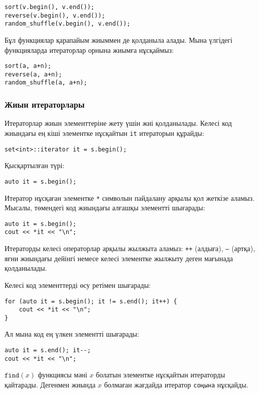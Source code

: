 
\begin{lstlisting}
sort(v.begin(), v.end());
reverse(v.begin(), v.end());
random_shuffle(v.begin(), v.end());
\end{lstlisting}

Бұл функциялар қарапайым жиыммен де қолданыла алады.
Мына үлгідегі функцияларда итераторлар орнына жиымға нұсқаймыз:

\begin{lstlisting}
sort(a, a+n);
reverse(a, a+n);
random_shuffle(a, a+n);
\end{lstlisting}

\subsubsection{Жиын итераторлары}
Итераторлар жиын элементтеріне жету үшін жиі қолданылады.
Келесі код жиындағы ең кіші элементке нұсқайтын \texttt{it} итераторын
құрайды:
\begin{lstlisting}
set<int>::iterator it = s.begin();
\end{lstlisting}
Қысқартылған түрі:
\begin{lstlisting}
auto it = s.begin();
\end{lstlisting}
Итератор нұсқаған элементке \texttt{*} символын 
пайдалану арқылы қол жеткізе аламыз.
Мысалы, төмендегі код жиындағы алғашқы элементті шығарады:

\begin{lstlisting}
auto it = s.begin();
cout << *it << "\n";
\end{lstlisting}

Итераторды келесі операторлар арқылы жылжыта аламыз:
\texttt{++} (алдыға), \texttt{--} (артқа), яғни жиындағы дейінгі немесе келесі элементке жылжыту
деген мағынада қолданылады.

Келесі код элементтерді өсу ретімен шығарады:
\begin{lstlisting}
for (auto it = s.begin(); it != s.end(); it++) {
    cout << *it << "\n";
}
\end{lstlisting}
Ал мына код ең үлкен элементті шығарады:
\begin{lstlisting}
auto it = s.end(); it--;
cout << *it << "\n";
\end{lstlisting}

$\texttt{find}(x)$ функциясы мәні $x$ болатын элементке 
нұсқайтын итераторды қайтарады.
Дегенмен жиында $x$ болмаған жағдайда итератор 
\texttt{соңына} нұсқайды.

